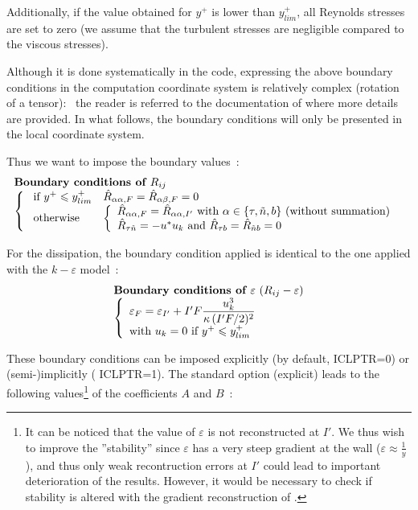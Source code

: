 Additionally, if the value obtained for $y^+$ is lower 
than  $y^+_{lim}$, all Reynolds stresses are set to zero 
(we assume that the turbulent stresses are negligible 
compared to the viscous stresses).

Although it is done systematically in the code, 
expressing the above boundary conditions in the computation coordinate
system is relatively complex (rotation of a tensor):~  
the reader is referred to the documentation of 
where more details are provided. In what follows, 
the boundary conditions will only be presented in the local
coordinate system. 

Thus we want to impose the boundary values~:
\begin{equation}
\begin{array}{l}
\text{\bf Boundary conditions of } R_{ij} \\
\left\{\begin{array}{lll}
\text{ if }y^+\leqslant y^+_{lim}&\hat R_{\alpha\alpha,F} = \hat R_{\alpha\beta,F} = 0 \\
\text { otherwise }                         &\left\{\begin{array}{l}
\hat R_{\alpha\alpha,F} = \hat R_{\alpha\alpha,I'}  \text{ with }\alpha \in \{\tau,\tilde{n},b\}\text{ (without summation)}\\
\hat R_{\tau\tilde{n}} = -u^*u_k  \text { and } \hat R_{\tau b} = \hat
R_{\tilde{n} b} =0
\end{array}\right.
\end{array}\right.
\end{array}
\end{equation}

For the dissipation, the boundary condition applied is identical to the 
one applied with the $k-\varepsilon$ model~:
\begin{equation}
\begin{array}{l}
\text{\bf Boundary conditions of } \varepsilon  \text{ }(R_{ij}-\varepsilon)  \\
\left\{
\begin{array}{l}
\varepsilon_F=\varepsilon_{I'}+I'F\displaystyle\frac{ u_k^3}{\kappa\, (I'F/2)^2}\\
\text{with } u_k = 0 \text { if } y^+\leqslant y^+_{lim}
\end{array}\right.
\end{array}
\end{equation}


These boundary conditions can be imposed explicitly (by default,  ICLPTR=0) 
or (semi-)implicitly ( ICLPTR=1). The standard option (explicit) leads to 
the following values\footnote{It can be noticed
that the value of $\varepsilon$ is not reconstructed at $I'$. We thus wish 
to improve the ''stability'' since $\varepsilon$ has a very steep gradient 
at the wall ($\varepsilon \approx \displaystyle\frac{1}{y}$), and thus  
only weak recontruction errors at $I'$ could lead to important 
deterioration of the results. However, it would be necessary to 
check if stability is altered with the gradient reconstruction of 
.}
of the coefficients  $A$ and $B$~:


